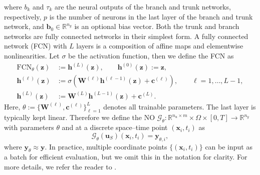 \documentclass[final,1p,times]{elsarticle}
\theoremstyle{plain} %
\theoremstyle{definition} %
\theoremstyle{remark} %
\begin{document}
where $b_k$ and $\tau_k$ are the neural outputs of the branch and trunk networks, respectively, $p$ is the number of neurons in the last layer of the branch and trunk network, and $\mathbf{b}_0 \in \mathbb{R}^{n_y}$ is an optional bias vector. Both the trunk and branch networks are fully connected networks in their simplest form. A fully connected network (FCN) with $L$ layers is a composition of affine maps and elementwise nonlinearities. Let $\sigma$ be the activation function, then we define the FCN as 
%
\begin{equation}\label{eq:MLP_general}
\begin{aligned}
\mathrm{FCN}_{\theta}(\mathbf{z})
&:= \mathbf{h}^{(L)}(\mathbf{z}), \qquad \mathbf{h}^{(0)}(\mathbf{z}) := \mathbf{z},\\
\mathbf{h}^{(\ell)}(\mathbf{z})
&:= \sigma\!\left(\mathbf{W}^{(\ell)}\mathbf{h}^{(\ell-1)}(\mathbf{z})+\mathbf{c}^{(\ell)}\right),
\qquad \ell=1,\dots,L-1,\\
\mathbf{h}^{(L)}(\mathbf{z})
&:= \mathbf{W}^{(L)}\mathbf{h}^{(L-1)}(\mathbf{z})+\mathbf{c}^{(L)}.
\end{aligned}
\end{equation}%
Here, $\theta := \{\mathbf{W}^{(\ell)},\mathbf{c}^{(\ell)}\}_{\ell=1}^{L}$ denotes all trainable parameters. The last layer is typically kept linear. Therefore we define the NO $\mathcal{G}_{\theta}:\mathbb{R}^{n_u\times m}\times \Omega\times [0,T]\rightarrow\mathbb{R}^{n_y}$ with parameters $\theta$ and at a discrete space–time point $(\mathbf{x}_i,t_i)$ as
\begin{equation}\label{NO_solution_operator}
\mathcal{G}_\theta(\mathbf{u}_S)(\mathbf{x}_i,t_i)=\mathbf{y}_{\theta,i},
\end{equation}
where $\mathbf{y}_\theta\approx \mathbf{y}$. In practice, multiple coordinate points $\{(\mathbf{x}_i,t_i)\}$ can be input as a batch for efficient evaluation, but we omit this in the notation for clarity. For more details, we refer the reader to \cite{lu2021learning,wang2021learning,wang2021understanding}. 
\end{document}
